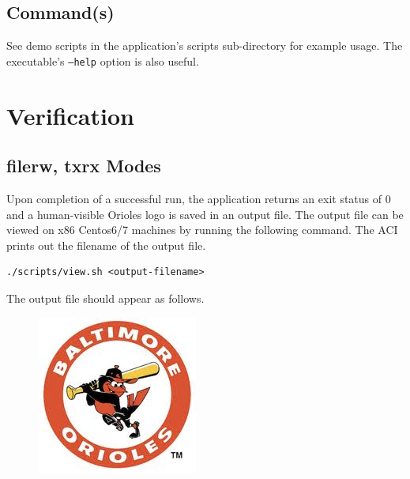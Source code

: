   \subsection{Command(s)}

    See demo scripts in the application's scripts
    sub-directory\cite{github_scripts_dir}
    for example
    usage. The executable's \texttt{--help} option is also useful.

\section{Verification}

  \subsection{filerw, txrx Modes}
    Upon completion of a successful run, the application returns an exit status
    of
    0
    and a human-visible Orioles logo is saved in an output file. The output file
    can
    be viewed on x86 Centos6/7 machines by running the following command. The
    ACI
    prints out the filename of the output file.
    \begin{lstlisting}
./scripts/view.sh <output-filename>
    \end{lstlisting}
    \noindent The output file should appear as follows.
    \begin{center}
      \begin{figure}[h]
        \centering\captionsetup{type=figure}\includegraphics[scale=0.6]{os}
        \label{fig:blockdiagram}
      \end{figure}
    \end{center}

